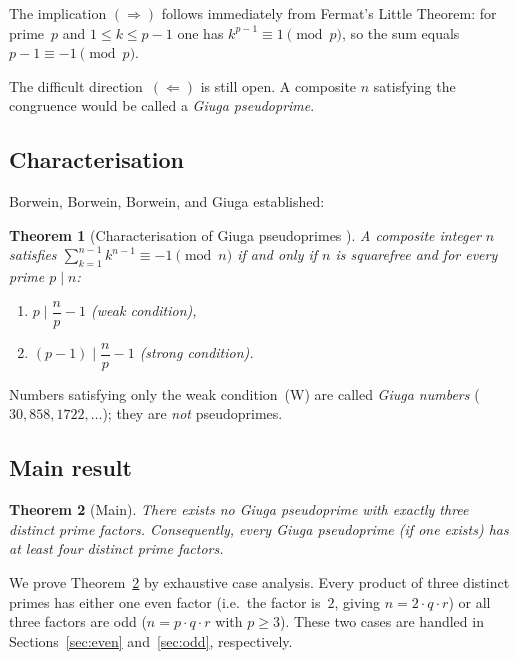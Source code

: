 \documentclass[12pt,a4paper]{amsart}
\newtheorem{theorem}{Theorem}[section]
\theoremstyle{definition}
\begin{document}
The implication $(\Rightarrow)$ follows immediately from Fermat's Little Theorem:
for prime~$p$ and $1 \le k \le p-1$ one has $k^{p-1} \equiv 1 \pmod{p}$,
so the sum equals $p - 1 \equiv -1 \pmod{p}$.

The difficult direction~$(\Leftarrow)$ is still open. A composite $n$
satisfying the congruence would be called a \emph{Giuga pseudoprime}.

\subsection{Characterisation}

Borwein, Borwein, Borwein, and Giuga \cite{Borwein1996} established:

\begin{theorem}[Characterisation of Giuga pseudoprimes {\cite{Borwein1996}}]
\label{thm:char}
A composite integer $n$ satisfies $\sum_{k=1}^{n-1} k^{n-1} \equiv -1 \pmod{n}$
if and only if $n$ is squarefree and for every prime $p \mid n$:
\begin{enumerate}
  \item[\textup{(W)}] $p \mid \dfrac{n}{p} - 1$  \quad\emph{(weak condition)},
  \item[\textup{(S)}] $(p-1) \mid \dfrac{n}{p} - 1$ \quad\emph{(strong condition)}.
\end{enumerate}
\end{theorem}

Numbers satisfying only the weak condition~(W) are called \emph{Giuga numbers}
($30, 858, 1722, \ldots$); they are \emph{not} pseudoprimes.

\subsection{Main result}

\begin{theorem}[Main]
\label{thm:main}
There exists no Giuga pseudoprime with exactly three distinct prime factors.
Consequently, every Giuga pseudoprime (if one exists) has at least four
distinct prime factors.
\end{theorem}

We prove Theorem~\ref{thm:main} by exhaustive case analysis.
Every product of three distinct primes has either one even factor (i.e.\ the
factor is~$2$, giving $n = 2 \cdot q \cdot r$) or all three factors are odd
($n = p \cdot q \cdot r$ with $p \ge 3$).  These two cases are handled in
Sections~\ref{sec:even} and~\ref{sec:odd}, respectively.
\end{document}

